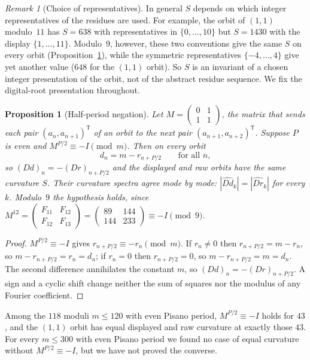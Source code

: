 \documentclass[12pt]{article}
\newtheorem{prop}{Proposition}
\theoremstyle{remark}
\newtheorem{rem}{Remark}
\begin{document}
\begin{rem}[Choice of representatives]\label{rem:reps}
In general $S$ depends on which integer representatives of the residues are used. For
example, the orbit of $(1,1)$ modulo~$11$ has $S=638$ with representatives in
$\{0,\dots,10\}$ but $S=1430$ with the display $\{1,\dots,11\}$. Modulo~$9$, however,
these two conventions give the same $S$ on every orbit (Proposition~\ref{prop:halfneg}),
while the symmetric representatives $\{-4,\dots,4\}$ give yet another value ($648$ for the
$(1,1)$ orbit). So $S$ is an invariant of a chosen integer presentation of the orbit, not
of the abstract residue sequence. We fix the digital-root presentation throughout.
\end{rem}

\begin{prop}[Half-period negation]\label{prop:halfneg}
Let $M=\begin{pmatrix}0&1\\1&1\end{pmatrix}$, the matrix that sends each pair
$(a_n,a_{n+1})^{\mathsf T}$ of an orbit to the next pair $(a_{n+1},a_{n+2})^{\mathsf T}$.
Suppose $P$ is even and $M^{P/2}\equiv -I\pmod m$. Then on
every orbit
\[
d_n=m-r_{n+P/2}\qquad\text{for all }n,
\]
so $(Dd)_n=-(Dr)_{n+P/2}$ and the displayed and raw orbits have the same curvature $S$.
Their curvature spectra agree mode by mode: $|\widehat{Dd}_k|=|\widehat{Dr}_k|$ for every
$k$. Modulo~$9$ the hypothesis holds, since
$M^{12}=\begin{pmatrix}F_{11}&F_{12}\\F_{12}&F_{13}\end{pmatrix}
=\begin{pmatrix}89&144\\144&233\end{pmatrix}\equiv -I\pmod 9$.
\end{prop}

\begin{proof}
$M^{P/2}\equiv -I$ gives $r_{n+P/2}\equiv -r_n\pmod m$. If $r_n\ne 0$ then
$r_{n+P/2}=m-r_n$, so $m-r_{n+P/2}=r_n=d_n$; if $r_n=0$ then $r_{n+P/2}=0$, so
$m-r_{n+P/2}=m=d_n$. The second difference annihilates the constant $m$, so
$(Dd)_n=-(Dr)_{n+P/2}$. A sign and a cyclic shift change neither the sum of squares nor
the modulus of any Fourier coefficient.
\end{proof}

Among the $118$ moduli $m\le 120$ with even Pisano period, $M^{P/2}\equiv -I$ holds for
$43$, and the $(1,1)$ orbit has equal displayed and raw curvature at exactly those $43$.
For every $m\le 300$ with even Pisano period we found no case of equal curvature without
$M^{P/2}\equiv -I$, but we have not proved the converse.
\end{document}
